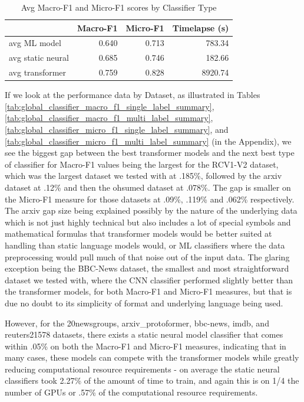 \documentclass[final]{clv2025-revised}
\begin{document}
\begin{table}[h!]
\centering
\small
\caption{Avg Macro-F1 and Micro-F1 scores by Classifier Type} %
\label{tab:summ_avg_macro_micro_f1} %
\begin{tabular}{lrrr} %
\toprule
 & \textbf{Macro-F1} & \textbf{Micro-F1} & \textbf{Timelapse (s)} \\
\midrule
avg ML model        & 0.640 & 0.713 &   783.34 \\
avg static neural   & 0.685 & 0.746 &   182.66 \\
avg transformer     & 0.759 & 0.828 &  8920.74 \\
\bottomrule
\end{tabular}
\end{table}

If we look at the performance data by Dataset, as illustrated in Tables \ref{tab:global_classifier_macro_f1_single_label_summary}, \ref{tab:global_classifier_macro_f1_multi_label_summary}, \ref{tab:global_classifier_micro_f1_single_label_summary}, and \ref{tab:global_classifier_micro_f1_multi_label_summary} (in the Appendix), we see the biggest gap between the best transformer models and the next best type of classifier for Macro-F1 values being the largest for the RCV1-V2 dataset, which was the largest dataset we tested with at .185\%, followed by the arxiv dataset at .12\% and then the ohsumed dataset at .078\%. The gap is smaller on the Micro-F1 measure for those datasets at .09\%, .119\% and .062\% respectively. The arxiv gap size being explained possibly by the nature of the underlying data which is not just highly technical but also includes a lot of special symbols and mathematical formulas that transformer models would be better suited at handling than static language models would, or ML classifiers where the data preprocessing would pull much of that noise out of the input data. The glaring exception being the BBC-News dataset, the smallest and most straightforward dataset we tested with, where the CNN classifier performed slightly better than the transformer models, for both Macro-F1 and Micro-F1 measures, but that is due no doubt to its simplicity of format and underlying language being used. 

However, for the 20newsgroups, arxiv\_protoformer, bbc-news, imdb, and reuters21578 datasets, there exists a static neural model classifier that comes within .05\% on both the Macro-F1 and Micro-F1 measures, indicating that in many cases, these models can compete with the transformer models while greatly reducing computational resource requirements - on average the static neural classifiers took 2.27\% of the amount of time to train, and again this is on 1/4 the number of GPUs or .57\% of the computational resource requirements.
\end{document}
